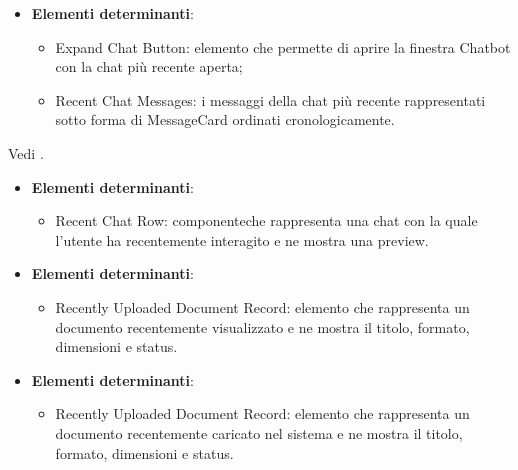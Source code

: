 \documentclass[10pt, a4paper]{article}
\begin{document}
\label{LatestChatContentDettaglio}
\begin{itemize}
    \item \textbf{Elementi determinanti}:
    \begin{itemize}
        \item Expand Chat Button: elemento che permette di aprire la finestra Chatbot con la chat più recente aperta;
        \item Recent Chat Messages: i messaggi della chat più recente rappresentati sotto forma di MessageCard ordinati cronologicamente.
    \end{itemize}
\end{itemize}

Vedi .


\label{RecentChatsListDettaglio}
\begin{itemize}
    \item \textbf{Elementi determinanti}:
    \begin{itemize}
        \item Recent Chat Row: componenteche rappresenta una chat con la quale l'utente ha recentemente interagito e ne mostra una preview.
    \end{itemize}
\end{itemize}


\label{RecentlyViewedTabDettaglio}
\begin{itemize}
    \item \textbf{Elementi determinanti}:
    \begin{itemize}
        \item Recently Uploaded Document Record: elemento che rappresenta un documento recentemente visualizzato e ne mostra il titolo, formato, dimensioni e status.
    \end{itemize}
\end{itemize}

\label{RecentlyUploadedTabDettaglio}
\begin{itemize}
    \item \textbf{Elementi determinanti}:
    \begin{itemize}
        \item Recently Uploaded Document Record: elemento che rappresenta un documento recentemente caricato nel sistema e ne mostra il titolo, formato, dimensioni e status.
    \end{itemize}
\end{itemize}
\end{document}
